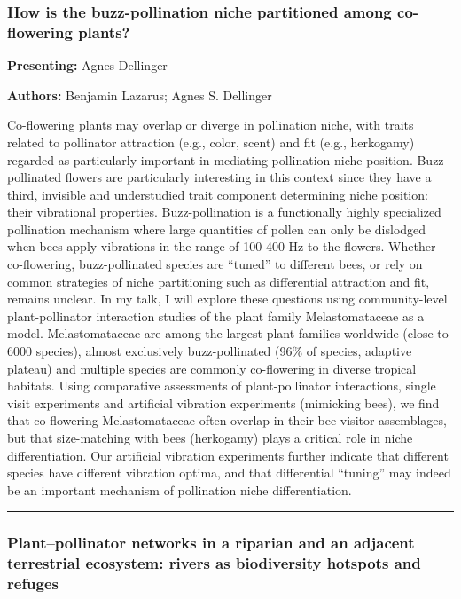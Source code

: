 \documentclass[
  letterpaper,
  DIV=11,
  numbers=noendperiod]{scrartcl}
\begin{document}
\subsubsection{How is the buzz-pollination niche partitioned among
co-flowering
plants?}\label{how-is-the-buzz-pollination-niche-partitioned-among-co-flowering-plants}

\textbf{Presenting:} Agnes Dellinger

\textbf{Authors:} Benjamin Lazarus; Agnes S. Dellinger

Co-flowering plants may overlap or diverge in pollination niche, with
traits related to pollinator attraction (e.g., color, scent) and fit
(e.g., herkogamy) regarded as particularly important in mediating
pollination niche position. Buzz-pollinated flowers are particularly
interesting in this context since they have a third, invisible and
understudied trait component determining niche position: their
vibrational properties. Buzz-pollination is a functionally highly
specialized pollination mechanism where large quantities of pollen can
only be dislodged when bees apply vibrations in the range of 100-400 Hz
to the flowers. Whether co-flowering, buzz-pollinated species are
``tuned'' to different bees, or rely on common strategies of niche
partitioning such as differential attraction and fit, remains unclear.
In my talk, I will explore these questions using community-level
plant-pollinator interaction studies of the plant family Melastomataceae
as a model. Melastomataceae are among the largest plant families
worldwide (close to 6000 species), almost exclusively buzz-pollinated
(96\% of species, adaptive plateau) and multiple species are commonly
co-flowering in diverse tropical habitats. Using comparative assessments
of plant-pollinator interactions, single visit experiments and
artificial vibration experiments (mimicking bees), we find that
co-flowering Melastomataceae often overlap in their bee visitor
assemblages, but that size-matching with bees (herkogamy) plays a
critical role in niche differentiation. Our artificial vibration
experiments further indicate that different species have different
vibration optima, and that differential ``tuning'' may indeed be an
important mechanism of pollination niche differentiation.

\begin{center}\rule{0.5\linewidth}{0.5pt}\end{center}

\subsubsection{Plant--pollinator networks in a riparian and an adjacent
terrestrial ecosystem: rivers as biodiversity hotspots and
refuges}\label{plantpollinator-networks-in-a-riparian-and-an-adjacent-terrestrial-ecosystem-rivers-as-biodiversity-hotspots-and-refuges}
\end{document}
